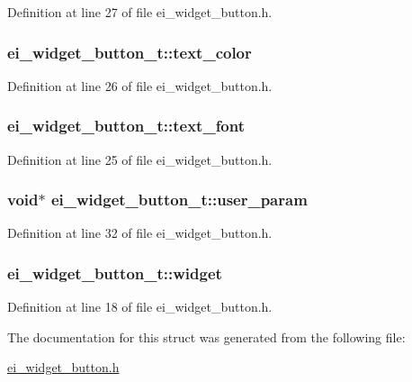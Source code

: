 Definition at line 27 of file ei\-\_\-widget\-\_\-button.\-h.

\hypertarget{structei__widget__button__t_a938724ea59ccdfbcbada1b237ad14640}{
\subsubsection[{text\-\_\-color}]{ ei\-\_\-widget\-\_\-button\-\_\-t\-::text\-\_\-color}}\label{structei__widget__button__t_a938724ea59ccdfbcbada1b237ad14640}


Definition at line 26 of file ei\-\_\-widget\-\_\-button.\-h.

\hypertarget{structei__widget__button__t_ad619e741a38f68fda98a9c9405225123}{
\subsubsection[{text\-\_\-font}]{ ei\-\_\-widget\-\_\-button\-\_\-t\-::text\-\_\-font}}\label{structei__widget__button__t_ad619e741a38f68fda98a9c9405225123}


Definition at line 25 of file ei\-\_\-widget\-\_\-button.\-h.

\hypertarget{structei__widget__button__t_a77f0c278c449eb8e90f6a7f8415ac882}{
\subsubsection[{user\-\_\-param}]{\setlength{\rightskip}{0pt plus 5cm}void$\ast$ ei\-\_\-widget\-\_\-button\-\_\-t\-::user\-\_\-param}}\label{structei__widget__button__t_a77f0c278c449eb8e90f6a7f8415ac882}


Definition at line 32 of file ei\-\_\-widget\-\_\-button.\-h.

\hypertarget{structei__widget__button__t_acf769e84e4a3cd0201c019998850deef}{
\subsubsection[{widget}]{ ei\-\_\-widget\-\_\-button\-\_\-t\-::widget}}\label{structei__widget__button__t_acf769e84e4a3cd0201c019998850deef}


Definition at line 18 of file ei\-\_\-widget\-\_\-button.\-h.



The documentation for this struct was generated from the following file\-:\begin{DoxyCompactItemize}
\item 
\hyperlink{ei__widget__button_8h}{ei\-\_\-widget\-\_\-button.\-h}\end{DoxyCompactItemize}
